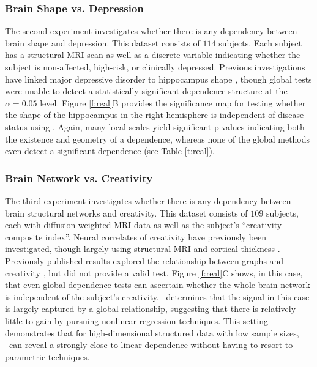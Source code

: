 \documentclass[11pt]{article}
\begin{document}
\subsubsection*{Brain Shape vs. Depression} 

The second experiment investigates whether there is any dependency between brain shape and depression. 
This  dataset consists of $114$ subjects. Each subject has a structural MRI scan as well as a discrete variable indicating whether the subject is non-affected, high-risk, or clinically depressed.  
% 
Previous investigations have linked major depressive disorder to hippocampus shape \cite{ParkEtAl2008,PosenerEtAl2003}, though global tests were unable to detect a statistically significant dependence structure at the $\alpha=0.05$ level.
% 
Figure \ref{f:real}{\color{magenta}B} provides the significance map for testing whether the shape of the hippocampus in the right hemisphere is independent of disease status using \Mgc. Again, many local scales yield significant p-values indicating both the existence and geometry of a dependence, whereas none of the global methods even detect a significant dependence  (see Table \ref{t:real}). 



\subsubsection*{Brain Network vs. Creativity}

The third experiment investigates whether there is any dependency between brain structural networks and creativity.  
% 
This dataset consists of $109$ subjects, each with diffusion weighted MRI data as well as the subject's ``creativity composite index''. 
Neural correlates of creativity have previously been investigated, though largely using structural MRI and cortical thickness \cite{Jung2009}.  Previously published results explored the relationship between graphs and  creativity \cite{Koutra15a}, but did not provide a valid test. 
% 
Figure \ref{f:real}{\color{magenta}C} shows, in this case,  that even global dependence tests can ascertain whether the whole brain network is independent of the subject's creativity.  \Mgc~determines that the signal in this case is largely captured by a global relationship, suggesting that there is relatively little to gain by pursuing nonlinear regression techniques. This setting demonstrates that for high-dimensional structured data with low sample sizes, \Mgc~can  reveal a strongly close-to-linear dependence without having to resort to parametric techniques.
\end{document}
